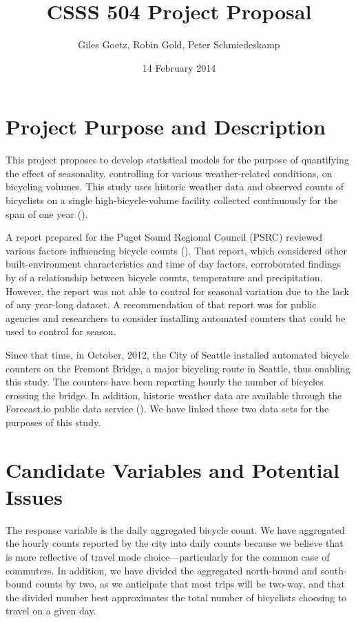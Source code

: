 \documentclass[11pt,letterpaper,article]{memoir} %
\title{CSSS 504 Project Proposal}
\author{Giles Goetz, Robin Gold, Peter Schmiedeskamp}
\date{14 February 2014} %
\begin{document}
\maketitle


\chapter*{Project Purpose and Description}
This project proposes to develop statistical models for the purpose of quantifying the effect of seasonality, controlling for various weather-related conditions, on bicycling volumes.  This study uses historic weather data and observed counts of bicyclists on a single high-bicycle-volume facility collected continuously for the span of one year (\cite{City-of-Seattle:aa}).

 A report prepared for the Puget Sound Regional Council (PSRC) reviewed various factors influencing bicycle counts (\cite{Bassok:2011aa}). That report, which considered other built-environment characteristics and time of day factors, corroborated findings by \textcite{City-of-Vancouver:1999aa,Niemeier:1996aa,Parkin:2008aa} of a relationship between bicycle counts, temperature and precipitation. However, the report was not able to control for seasonal variation due to the lack of any year-long dataset. A recommendation of that report was for public agencies and researchers to consider installing automated counters that could be used to control for season.

Since that time, in October, 2012, the City of Seattle installed automated bicycle counters on the Fremont Bridge, a major bicycling route in Seattle, thus enabling this study. The counters have been reporting hourly the number of bicycles crossing the bridge. In addition, historic weather data are available through the Forecast.io public data service (\cite{The-Dark-Sky-Company:aa}). We have linked these two data sets for the purposes of this study.


\chapter*{Candidate Variables and Potential Issues}
The response variable is the daily aggregated bicycle count. We have aggregated the hourly counts reported by the city into daily counts because we believe that is more reflective of travel mode choice---particularly for the common case of commuters. In addition, we have divided the aggregated north-bound and south-bound counts by two, as we anticipate that most trips will be two-way, and that the divided number best approximates the total number of bicyclists choosing to travel on a given day.
\end{document}
